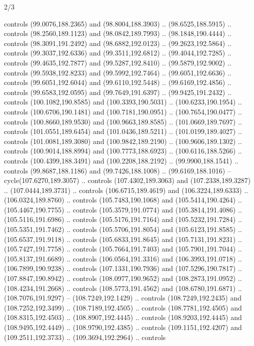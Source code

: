 \begin{flagdescription}{2/3}
\begin{scope}[shift={(0.5\flaglength,0.5)},scale=\flagwidth/320]
\begin{scope}[y=0.8pt, x=0.8pt, yscale=-1,shift={(-118.3,-146)}]
  controls (99.0076,188.2365) and (98.8004,188.3903) .. (98.6525,188.5915) ..
  controls (98.2560,189.1123) and (98.0842,189.7993) .. (98.1848,190.4444) ..
  controls (98.3091,191.2492) and (98.6882,192.0123) .. (99.2623,192.5864) ..
  controls (99.3037,192.6336) and (99.3511,192.6812) .. (99.4044,192.7285) ..
  controls (99.4635,192.7877) and (99.5287,192.8410) .. (99.5879,192.9002) ..
  controls (99.5938,192.8233) and (99.5992,192.7464) .. (99.6051,192.6636) ..
  controls (99.6051,192.6044) and (99.6110,192.5448) .. (99.6169,192.4856) ..
  controls (99.6583,192.0595) and (99.7649,191.6397) .. (99.9425,191.2432) ..
  controls (100.1082,190.8585) and (100.3393,190.5031) .. (100.6233,190.1954) ..
  controls (100.6706,190.1481) and (100.7181,190.0951) .. (100.7654,190.0477) ..
  controls (100.8660,189.9530) and (100.9663,189.8585) .. (101.0669,189.7697) ..
  controls (101.0551,189.6454) and (101.0436,189.5211) .. (101.0199,189.4027) ..
  controls (101.0081,189.3080) and (100.9842,189.2190) .. (100.9606,189.1302) ..
  controls (100.9014,188.8994) and (100.7773,188.6923) .. (100.6116,188.5266) ..
  controls (100.4399,188.3491) and (100.2208,188.2192) .. (99.9900,188.1541) ..
  controls (99.8687,188.1186) and (99.7426,188.1008) .. (99.6169,188.1016) --
  cycle(107.6270,189.3057) .. controls (107.4302,189.3063) and
  (107.2338,189.3287) .. (107.0444,189.3731) .. controls (106.6715,189.4619) and
  (106.3224,189.6333) .. (106.0324,189.8760) .. controls (105.7483,190.1068) and
  (105.5414,190.4264) .. (105.4467,190.7755) .. controls (105.3579,191.0774) and
  (105.3814,191.4086) .. (105.5116,191.6986) .. controls (105.5176,191.7164) and
  (105.5232,191.7284) .. (105.5351,191.7462) .. controls (105.5706,191.8054) and
  (105.6123,191.8585) .. (105.6537,191.9118) .. controls (105.6833,191.8645) and
  (105.7131,191.8231) .. (105.7427,191.7758) .. controls (105.7664,191.7403) and
  (105.7901,191.7044) .. (105.8137,191.6689) .. controls (106.0564,191.3316) and
  (106.3993,191.0718) .. (106.7899,190.9238) .. controls (107.1331,190.7936) and
  (107.5296,190.7817) .. (107.8847,190.8942) .. controls (108.0977,190.9652) and
  (108.2873,191.0952) .. (108.4234,191.2668) .. controls (108.5773,191.4562) and
  (108.6780,191.6871) .. (108.7076,191.9297) -- (108.7249,192.1429) .. controls
  (108.7249,192.2435) and (108.7252,192.3499) .. (108.7189,192.4505) .. controls
  (108.7781,192.4505) and (108.8315,192.4503) .. (108.8907,192.4445) .. controls
  (108.9203,192.4445) and (108.9495,192.4449) .. (108.9790,192.4385) .. controls
  (109.1151,192.4207) and (109.2511,192.3733) .. (109.3694,192.2964) .. controls

\end{scope}
\end{scope}
\end{flagdescription}
